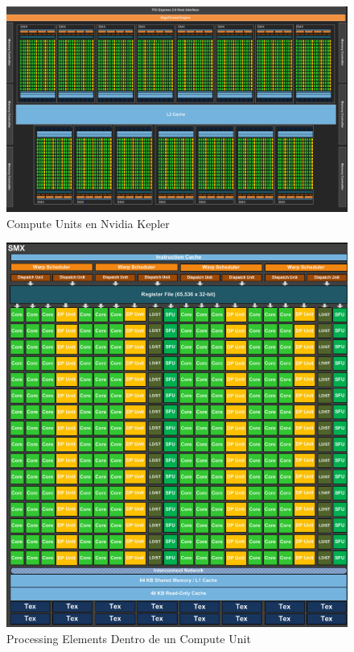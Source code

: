 \begin{figure}[h]
    \includegraphics[width=1.0\textwidth]{kepler_1}
    \caption{Compute Units en Nvidia Kepler}
    \label{fig:kepler1}
\end{figure}

\begin{figure}[h]
    \includegraphics[width=1.0\textwidth]{kepler_2}
    \caption{Processing Elements Dentro de un Compute Unit}
    \label{fig:kepler2}
\end{figure}


